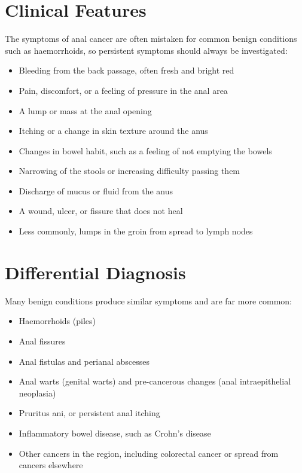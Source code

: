 \section*{Clinical Features}
The symptoms of anal cancer are often mistaken for common benign conditions such as haemorrhoids, so persistent symptoms should always be investigated:
\begin{itemize}
    \item Bleeding from the back passage, often fresh and bright red
    \item Pain, discomfort, or a feeling of pressure in the anal area
    \item A lump or mass at the anal opening
    \item Itching or a change in skin texture around the anus
    \item Changes in bowel habit, such as a feeling of not emptying the bowels
    \item Narrowing of the stools or increasing difficulty passing them
    \item Discharge of mucus or fluid from the anus
    \item A wound, ulcer, or fissure that does not heal
    \item Less commonly, lumps in the groin from spread to lymph nodes
\end{itemize}

\section*{Differential Diagnosis}
Many benign conditions produce similar symptoms and are far more common:
\begin{itemize}
    \item Haemorrhoids (piles)
    \item Anal fissures
    \item Anal fistulas and perianal abscesses
    \item Anal warts (genital warts) and pre-cancerous changes (anal intraepithelial neoplasia)
    \item Pruritus ani, or persistent anal itching
    \item Inflammatory bowel disease, such as Crohn's disease
    \item Other cancers in the region, including colorectal cancer or spread from cancers elsewhere
\end{itemize}

